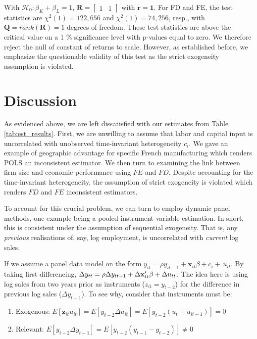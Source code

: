 \documentclass[11pt]{article}
\begin{document}
With $\mathcal{H}_0:\beta_K+\beta_L=1$, $\mathbf{R}=\left[
    \begin{array}{ll}
    1 & 1 
    \end{array}\right]$ with $\mathbf{r=1}$. 
For FD and FE, the test statistics are $\chi^2 (1)=122,656$ and $\chi^2 (1)=74,256$, resp., with $\mathbf{Q}=rank(\mathbf{R})=1$ degrees of freedom. These test statistics are above the critical value on a 1 \% significance level with p-values equal to zero. We therefore reject the null of constant of returns to scale. However, as established before, we emphasize the questionable validity of this test as the strict exogeneity assumption is violated. 

\section{Discussion}
As evidenced above, we are left dissatisfied with our estimates from Table \ref{tab:est_results}. First, we are unwilling to assume that labor and capital input is uncorrelated with unobserved time-invariant heterogeneity $c_i$. We gave an example of geographic advantage for specific French manufacturing which renders POLS an inconsistent estimator. We then turn to examining the link between firm size and economic performance using $FE$ and $FD$. Despite accounting for the time-invariant heterogeneity, the assumption of strict exogeneity is violated which renders $FD$ and $FE$ inconsistent estimators. 

To account for this crucial problem, we can turn to employ dynamic panel methods, one example being a pooled instrument variable estimation. In short, this is consistent under the assumption of sequential exogeneity. That is, any \textit{previous} realisations of, say, log employment, is uncorrelated with \textit{current} log sales.

If we assume a panel data model on the form $y_{i t}=\rho y_{i t-1}+\mathbf{x}_{i t}\beta+c_{i}+\,u_{i t}$. By taking first differencing, $\Delta y_{t t}=\rho\Delta y_{t t-1}+\Delta{\bf x}_{t t}^{\prime}\beta+\Delta u_{t t}$. The idea here is using log sales from two years prior as instruments ($z_{it}=y_{t-2}$) for the difference in previous log sales ($\Delta y_{t-1}$). To see why, consider that instruments must be:

\begin{enumerate}
    \item Exogenous: $E\left[\mathbf{z}_{i t} u_{i t}\right]=E\left[y_{t-2}\Delta u_{it}\right]=E\left[y_{t-2} (u_{t}-u_{i t-1})\right]=0$
    \item Relevant: $E\left[y_{t-2}\Delta y_{t-1}\right]=E\left[y_{t-2}(y_{t-1}-y_{t-2})\right]\neq 0$
\end{enumerate}
\end{document}

